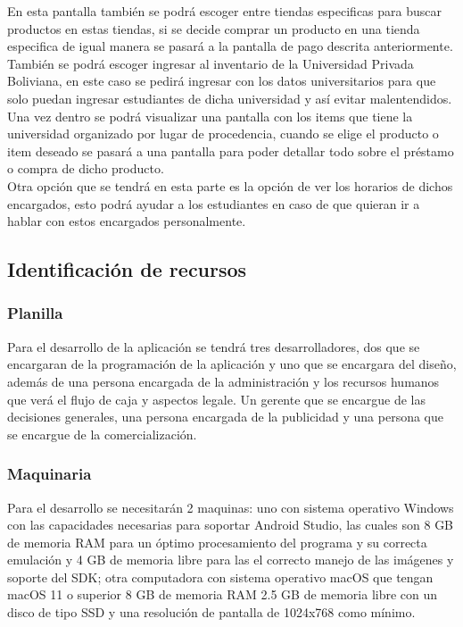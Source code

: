 \documentclass[11pt]{article}
\begin{document}
        En esta pantalla también se podr\'a escoger entre tiendas especificas para buscar productos en estas tiendas, si se decide comprar un producto en una tienda especifica de igual manera se pasar\'a a la pantalla de pago descrita anteriormente. \\
        
        También se podrá escoger ingresar al inventario de la Universidad Privada Boliviana, en este caso se pedirá ingresar con los datos universitarios para que solo puedan ingresar estudiantes de dicha universidad y así evitar malentendidos. Una vez dentro se podrá visualizar una pantalla con los items que tiene la universidad organizado por lugar de procedencia, cuando se elige el producto o item deseado se pasar\'a a una pantalla para poder detallar todo sobre el préstamo o compra de dicho producto.\\
        
        Otra opción que se tendrá en esta parte es la opción de ver los horarios de dichos encargados, esto podrá ayudar a los estudiantes en caso de que quieran ir a hablar con estos encargados personalmente.
        
    \subsection{Identificación de recursos}
        \subsubsection{Planilla}
        Para el desarrollo de la aplicación se tendrá tres desarrolladores, dos que se encargaran de la programaci\'on de la aplicaci\'on y uno que se encargara del diseño, además de una persona encargada de la administraci\'on y los recursos humanos que ver\'a el flujo de caja y aspectos legale.
        Un gerente que se encargue de las decisiones generales, una persona encargada de la publicidad y una persona que se encargue de la comercializaci\'on.
        
        \newpage
        \subsubsection{Maquinaria}
        
        Para el desarrollo se necesitar\'an 2 maquinas: uno con sistema operativo Windows con las capacidades necesarias para soportar Android Studio, las cuales son 8 GB de memoria RAM para un óptimo procesamiento del programa y su correcta emulación y 4 GB de memoria libre para las el correcto manejo de las imágenes y soporte del SDK; otra computadora con sistema operativo macOS que tengan macOS 11 o superior 8 GB de memoria RAM 2.5 GB de memoria libre con un disco de tipo SSD y una resolución de pantalla de 1024x768 como mínimo.
        
\end{document}
